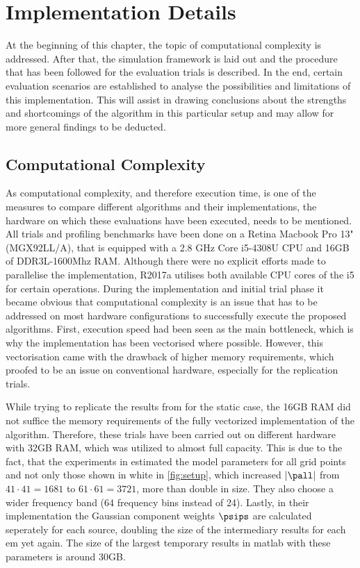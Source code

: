 \section{Implementation Details}
\label{chap:implementation}

At the beginning of this chapter, the topic of computational complexity is addressed. After that, the simulation framework is laid out and the procedure that has been followed for the evaluation trials is described. In the end, certain evaluation scenarios are established to analyse the possibilities and limitations of this implementation. This will assist in drawing conclusions about the strengths and shortcomings of the algorithm in this particular setup and may allow for more general findings to be deducted.

\subsection{Computational Complexity}\label{sec:computationalComplexity} As computational complexity, and therefore execution time, is one of the measures to compare different algorithms and their implementations, the hardware on which these evaluations have been executed, needs to be mentioned. All trials and profiling benchmarks have been done on a Retina Macbook Pro 13" (MGX92LL/A), that is equipped with a 2.8 GHz Core i5-4308U CPU and 16GB of DDR3L-1600Mhz RAM. Although there were no explicit efforts made to parallelise the implementation, \matlab R2017a utilises both available CPU cores of the i5 for certain operations. During the implementation and initial trial phase it became obvious that computational complexity is an issue that has to be addressed on most hardware configurations to successfully execute the proposed algorithms. First, execution speed had been seen as the main bottleneck, which is why the implementation has been vectorised where possible. However, this vectorisation came with the drawback of higher memory requirements, which proofed to be an issue on conventional hardware, especially for the replication trials.


While trying to replicate the results from \cite{Schwartz2014} for the static case, the 16GB RAM did not suffice the memory requirements of the fully vectorized implementation of the algorithm. Therefore, these trials have been carried out on different hardware with 32GB RAM, which was utilized to almost full capacity. This is due to the fact, that the experiments in \cite{Schwartz2014} estimated the model parameters for all grid points and not only those shown in white in \autoref{fig:setup}, which increased $|\pall|$ from $41 \cdot 41 = 1681$ to $61\cdot61=3721$, more than double in size. They also choose a wider frequency band (64 frequency bins instead of 24). Lastly, in their implementation the Gaussian component weights $\psips$ are calculated seperately for each source, doubling the size of the intermediary results for each \gls{em} yet again. The size of the largest temporary results in matlab with these parameters is around $30$GB.
